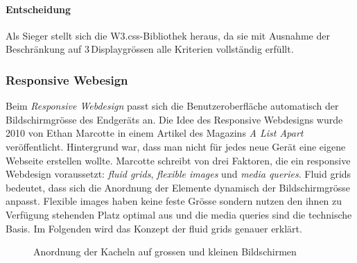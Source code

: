 \paragraph*{Entscheidung}
Als Sieger stellt sich die W3.css-Bibliothek heraus, da sie mit Ausnahme der Beschränkung auf 3\,Displaygrössen alle Kriterien vollständig erfüllt.


\subsubsection{Responsive Webesign}
\label{subsec:responsiveFactors}
Beim \emph{Responsive Webdesign} passt sich die Benutzeroberfläche automatisch der Bildschirmgrösse des Endgeräts an. Die Idee des Responsive Webdesigns wurde 2010 von Ethan Marcotte in einem Artikel des Magazins \emph{A List Apart}~\cite{EthMarRWD} veröffentlicht. Hintergrund war, dass man nicht für jedes neue Gerät eine eigene Webseite erstellen wollte. Marcotte schreibt von drei Faktoren, die ein responsive Webdesign voraussetzt: \emph{fluid grids}, \emph{flexible images} und \emph{media queries}. Fluid grids bedeutet, dass sich die Anordnung der Elemente dynamisch der Bildschirmgrösse anpasst. Flexible images haben keine feste Grösse sondern nutzen den ihnen zu Verfügung stehenden Platz optimal aus und die media queries sind die technische Basis. Im Folgenden wird das Konzept der fluid grids genauer erklärt.

\begin{figure}[htb!]
	\centering
	\caption{Anordnung der Kacheln auf grossen und kleinen Bildschirmen}
	\label{img:kacheln2}
\end{figure}

